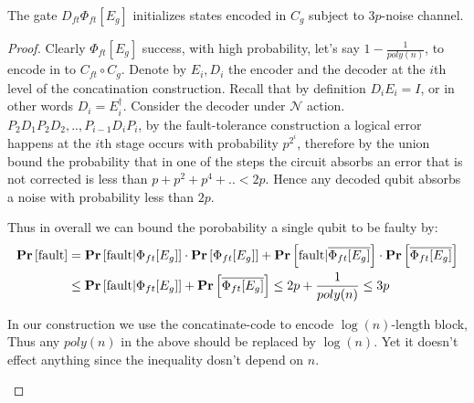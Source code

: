 \documentclass[manuscript,screen,review]{acmart}
\begin{document}
\begin{claim}
  The gate $ D_{ft} \Phi_{ft}[E_{g}]$ initializes states encoded in $C_{g}$ subject to $3p$-noise channel.  
\end{claim}
\begin{proof}
  Clearly $\Phi_{ft}[E_{g}]$ success, with high probability, let's say $1 - \frac{1}{poly(n)}$, to encode in to $ C_{ft} \circ C_{g}$. Denote by $E_{i}, D_{i}$ the encoder and the decoder at the $i$th level of the concatination construction. Recall that by definition $D_{i}E_{i} = I$, or in other words $D_{i}= E_{i}^{\dagger}$. Consider the decoder under $\mathcal{N}$ action. $P_{2}D_{1}P_{2}D_{2},..,P_{i-1}D_{i}P_{i}$, by the fault-tolerance construction  a logical error happens at the $i$th stage occurs with probability $p^{2^{i}}$, therefore by the union bound the probability that in one of the steps the circuit absorbs an error that is not corrected is less than $p + p^{2} + p^{4} + .. < 2p$. Hence any decoded qubit absorbs a noise with probability less than $2p$.


  Thus in overall we can bound the porobability a single qubit to be faulty by: 
  \begin{equation*}
    \begin{split}
      \mathbf{Pr} \left[ \text{fault}  \right] &=  \mathbf{Pr} \left[ \text{fault} |  \Phi_{ft}[E_{g}]  \right]\cdot \mathbf{Pr} \left[ \Phi_{ft}[E_{g}] \right] + \mathbf{Pr} \left[ \text{fault} | \overline{\Phi_{ft}[E_{g}]}  \right]\cdot \mathbf{Pr} \left[ \overline{\Phi_{ft}[E_{g}]} \right]\\
      &\le  \mathbf{Pr} \left[ \text{fault} |  \Phi_{ft}[E_{g}]  \right] + \mathbf{Pr} \left[ \overline{\Phi_{ft}[E_{g}]} \right] \le 2p + \frac{1}{poly(n)} \le 3p
    \end{split}
  \end{equation*}

  \begin{remark}
    In our construction we use the concatinate-code to encode $\log(n)$-length block, Thus any $poly(n)$ in the above should be replaced by $\log(n)$. Yet it doesn't effect anything since the inequality dosn't depend on $n$.
  \end{remark}


\end{proof}
\end{document}
